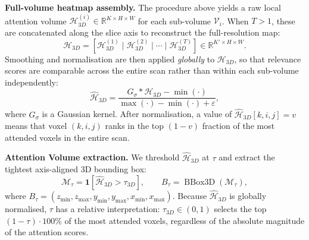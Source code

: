 \documentclass[sigconf, screen, review, anonymous]{acmart}
\begin{document}
\noindent\textbf{Full-volume heatmap assembly.}
The procedure above yields a raw local attention volume $\mathcal{H}^{(i)}_{3D} \in \mathbb{R}^{K \times H \times W}$ for each sub-volume $\mathcal{V}_i$. When $T > 1$, these are concatenated along the slice axis to reconstruct the full-resolution map:
%
\begin{equation}
    \mathcal{H}_{3D} = \left[\mathcal{H}^{(1)}_{3D} \;\big|\; \mathcal{H}^{(2)}_{3D} \;\big|\; \cdots \;\big|\; \mathcal{H}^{(T)}_{3D}\right] \in \mathbb{R}^{K' \times H \times W}.
    \label{eq:heatmap_concat}
\end{equation}
%
Smoothing and normalisation are then applied \emph{globally} to $\mathcal{H}_{3D}$, so that relevance scores are comparable across the entire scan rather than within each sub-volume independently:
%
\begin{equation}
    \hat{\mathcal{H}}_{3D} =
        \frac{G_\sigma * \mathcal{H}_{3D} - \min(\cdot)}
             {\max(\cdot) - \min(\cdot) + \varepsilon},
    \label{eq:norm}
\end{equation}
%
where $G_\sigma$ is a Gaussian kernel. After normalisation, a value of $\hat{\mathcal{H}}_{3D}[k,i,j] = v$ means that voxel $(k,i,j)$ ranks in the top $(1-v)$ fraction of the most attended voxels in the entire scan.

\smallskip
\noindent\textbf{Attention Volume extraction.}
We threshold $\hat{\mathcal{H}}_{3D}$ at $\tau$ and extract the tightest axis-aligned 3D bounding box:
%
\begin{equation}
    \mathcal{M}_\tau = \mathbf{1}\!\left[\hat{\mathcal{H}}_{3D} > \tau_{3D}\right],
    \qquad
    B_\tau = \operatorname{BBox3D}(\mathcal{M}_\tau),
    \label{eq:bbox}
\end{equation}
%
where $B_\tau = (z_{\min}, z_{\max}, y_{\min}, y_{\max}, x_{\min}, x_{\max})$. Because $\hat{\mathcal{H}}_{3D}$ is globally normalised, $\tau$ has a relative interpretation: $\tau_{3D} \in (0,1)$ selects the top $(1-\tau)\cdot100\%$ of the most attended voxels, regardless of the absolute magnitude of the attention scores.


\end{document}
